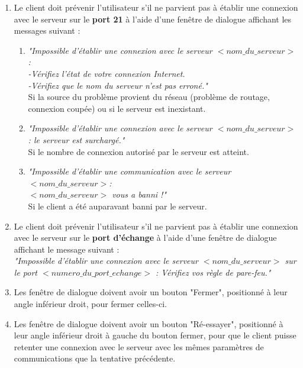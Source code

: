 \documentclass[10pt,a4paper]{report}
\begin{document}
		\begin{enumerate}
			\item Le client doit prévenir l'utilisateur s'il ne parvient pas à établir une connexion avec le serveur sur le \textbf{port 21} à l'aide d'une fenêtre de dialogue affichant les messages suivant : 

			\begin{enumerate}[label=\arabic*.]
				\item \textit{"Impossible d'établir une connexion avec le serveur $< nom\_du\_serveur>$:\\
-Vérifiez l'état de votre connexion Internet.\\
-Vérifiez que le nom du serveur n'est pas erroné."\\}
Si la source du problème provient du réseau (problème de routage, connexion coupée) ou si le serveur est inexistant.

				\item \textit{"Impossible d'établir une connexion avec le serveur $< nom\_du\_serveur>$: le serveur est surchargé."\\}
Si le nombre de connexion autorisé par le serveur est atteint.

				\item \textit{"Impossible d'établir une communication avec le serveur $< nom\_du\_serveur>$:\\
$< nom\_du\_serveur>$ vous a banni !"\\}
Si le client a été auparavant banni par le serveur. 
			\end{enumerate}

			\item Le client doit prévenir l'utilisateur s'il ne parvient pas à établir une connexion avec le serveur sur le \textbf{port d'échange} à l'aide d'une fenêtre de dialogue affichant le message suivant : \\
\textit{"Impossible d'établir une connexion avec le serveur $< nom\_du\_serveur>$ sur le port $< numero\_du\_port\_echange>$ : Vérifiez vos règle de pare-feu."\\}

			\item Les fenêtre de dialogue doivent avoir un bouton "Fermer", positionné à leur angle inférieur droit, pour fermer celles-ci.

			\item Les fenêtre de dialogue doivent avoir un bouton "Ré-essayer", positionné à leur angle inférieur droit à gauche du bouton fermer, pour que le client puisse retenter une connexion avec le serveur avec les mêmes paramètres de communications que la tentative précédente.

		\end{enumerate}
		
\end{document}

